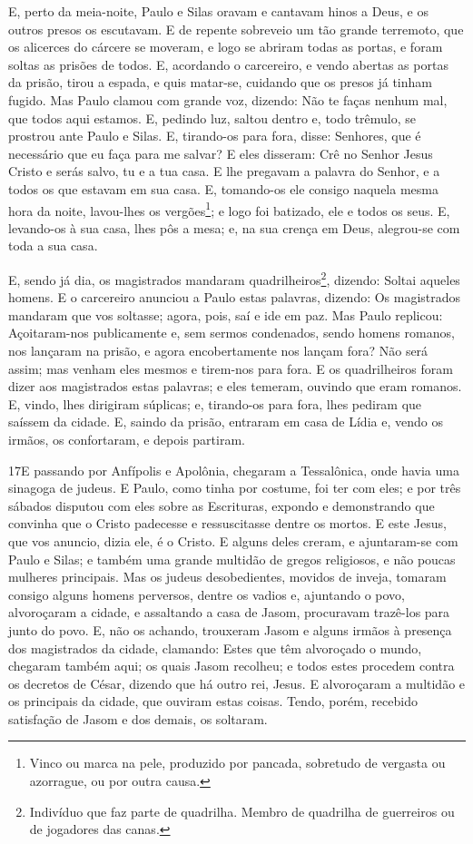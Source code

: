 E, perto da meia-noite, Paulo e Silas oravam e cantavam hinos a
Deus, e os outros presos os escutavam. E de repente sobreveio
um tão grande terremoto, que os alicerces do cárcere se moveram, e
logo se abriram todas as portas, e foram soltas as prisões de todos.
E, acordando o carcereiro, e vendo abertas as portas da
prisão, tirou a espada, e quis matar-se, cuidando que os presos já
tinham fugido. Mas Paulo clamou com grande voz, dizendo: Não
te faças nenhum mal, que todos aqui estamos. E, pedindo luz,
saltou dentro e, todo trêmulo, se prostrou ante Paulo e Silas.
E, tirando-os para fora, disse: Senhores, que é necessário
que eu faça para me salvar? E eles disseram: Crê no Senhor
Jesus Cristo e serás salvo, tu e a tua casa. E lhe pregavam a
palavra do Senhor, e a todos os que estavam em sua casa. E,
tomando-os ele consigo naquela mesma hora da noite, lavou-lhes os
vergões\footnote{Vinco ou marca na pele, produzido por pancada,
sobretudo de vergasta ou azorrague, ou por outra causa.}; e logo foi
batizado, ele e todos os seus. E, levando-os à sua casa, lhes
pôs a mesa; e, na sua crença em Deus, alegrou-se com toda a sua
casa.

E, sendo já dia, os magistrados mandaram
quadrilheiros\footnote{Indivíduo que faz parte de quadrilha. Membro
de quadrilha de guerreiros ou de jogadores das canas.}, dizendo:
Soltai aqueles homens. E o carcereiro anunciou a Paulo estas
palavras, dizendo: Os magistrados mandaram que vos soltasse; agora,
pois, saí e ide em paz. Mas Paulo replicou: Açoitaram-nos
publicamente e, sem sermos condenados, sendo homens romanos, nos
lançaram na prisão, e agora encobertamente nos lançam fora? Não será
assim; mas venham eles mesmos e tirem-nos para fora. E os
quadrilheiros foram dizer aos magistrados estas palavras; e eles
temeram, ouvindo que eram romanos. E, vindo, lhes dirigiram
súplicas; e, tirando-os para fora, lhes pediram que saíssem da
cidade. E, saindo da prisão, entraram em casa de Lídia e,
vendo os irmãos, os confortaram, e depois partiram.

\medskip

\lettrine{17} E passando por Anfípolis e Apolônia, chegaram a
Tessalônica, onde havia uma sinagoga de judeus. E Paulo, como
tinha por costume, foi ter com eles; e por três sábados disputou com
eles sobre as Escrituras, expondo e demonstrando que convinha
que o Cristo padecesse e ressuscitasse dentre os mortos. E este
Jesus, que vos anuncio, dizia ele, é o Cristo. E alguns deles
creram, e ajuntaram-se com Paulo e Silas; e também uma grande
multidão de gregos religiosos, e não poucas mulheres principais.
Mas os judeus desobedientes, movidos de inveja, tomaram consigo
alguns homens perversos, dentre os vadios e, ajuntando o povo,
alvoroçaram a cidade, e assaltando a casa de Jasom, procuravam
trazê-los para junto do povo. E, não os achando, trouxeram Jasom
e alguns irmãos à presença dos magistrados da cidade, clamando:
Estes que têm alvoroçado o mundo, chegaram também aqui; os quais
Jasom recolheu; e todos estes procedem contra os decretos de César,
dizendo que há outro rei, Jesus. E alvoroçaram a multidão e os
principais da cidade, que ouviram estas coisas. Tendo, porém,
recebido satisfação de Jasom e dos demais, os soltaram.

